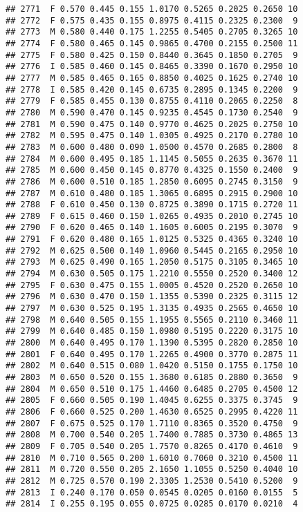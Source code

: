 \documentclass[
]{article}
\begin{document}
\begin{verbatim}
## 2771  F 0.570 0.445 0.155 1.0170 0.5265 0.2025 0.2650 10
## 2772  F 0.575 0.435 0.155 0.8975 0.4115 0.2325 0.2300  9
## 2773  M 0.580 0.440 0.175 1.2255 0.5405 0.2705 0.3265 10
## 2774  F 0.580 0.465 0.145 0.9865 0.4700 0.2155 0.2500 11
## 2775  F 0.580 0.425 0.150 0.8440 0.3645 0.1850 0.2705  9
## 2776  I 0.585 0.460 0.145 0.8465 0.3390 0.1670 0.2950 10
## 2777  M 0.585 0.465 0.165 0.8850 0.4025 0.1625 0.2740 10
## 2778  I 0.585 0.420 0.145 0.6735 0.2895 0.1345 0.2200  9
## 2779  F 0.585 0.455 0.130 0.8755 0.4110 0.2065 0.2250  8
## 2780  M 0.590 0.470 0.145 0.9235 0.4545 0.1730 0.2540  9
## 2781  M 0.590 0.475 0.140 0.9770 0.4625 0.2025 0.2750 10
## 2782  M 0.595 0.475 0.140 1.0305 0.4925 0.2170 0.2780 10
## 2783  M 0.600 0.480 0.090 1.0500 0.4570 0.2685 0.2800  8
## 2784  M 0.600 0.495 0.185 1.1145 0.5055 0.2635 0.3670 11
## 2785  M 0.600 0.450 0.145 0.8770 0.4325 0.1550 0.2400  9
## 2786  M 0.600 0.510 0.185 1.2850 0.6095 0.2745 0.3150  9
## 2787  M 0.610 0.480 0.185 1.3065 0.6895 0.2915 0.2900 10
## 2788  F 0.610 0.450 0.130 0.8725 0.3890 0.1715 0.2720 11
## 2789  F 0.615 0.460 0.150 1.0265 0.4935 0.2010 0.2745 10
## 2790  F 0.620 0.465 0.140 1.1605 0.6005 0.2195 0.3070  9
## 2791  F 0.620 0.480 0.165 1.0125 0.5325 0.4365 0.3240 10
## 2792  M 0.625 0.500 0.140 1.0960 0.5445 0.2165 0.2950 10
## 2793  M 0.625 0.490 0.165 1.2050 0.5175 0.3105 0.3465 10
## 2794  M 0.630 0.505 0.175 1.2210 0.5550 0.2520 0.3400 12
## 2795  F 0.630 0.475 0.155 1.0005 0.4520 0.2520 0.2650 10
## 2796  M 0.630 0.470 0.150 1.1355 0.5390 0.2325 0.3115 12
## 2797  M 0.630 0.525 0.195 1.3135 0.4935 0.2565 0.4650 10
## 2798  M 0.640 0.505 0.155 1.1955 0.5565 0.2110 0.3460 11
## 2799  M 0.640 0.485 0.150 1.0980 0.5195 0.2220 0.3175 10
## 2800  M 0.640 0.495 0.170 1.1390 0.5395 0.2820 0.2850 10
## 2801  F 0.640 0.495 0.170 1.2265 0.4900 0.3770 0.2875 11
## 2802  M 0.640 0.515 0.080 1.0420 0.5150 0.1755 0.1750 10
## 2803  M 0.650 0.520 0.155 1.3680 0.6185 0.2880 0.3650  9
## 2804  M 0.650 0.510 0.175 1.4460 0.6485 0.2705 0.4500 12
## 2805  F 0.660 0.505 0.190 1.4045 0.6255 0.3375 0.3745  9
## 2806  F 0.660 0.525 0.200 1.4630 0.6525 0.2995 0.4220 11
## 2807  F 0.675 0.525 0.170 1.7110 0.8365 0.3520 0.4750  9
## 2808  M 0.700 0.540 0.205 1.7400 0.7885 0.3730 0.4865 13
## 2809  F 0.705 0.540 0.205 1.7570 0.8265 0.4170 0.4610  9
## 2810  M 0.710 0.565 0.200 1.6010 0.7060 0.3210 0.4500 11
## 2811  M 0.720 0.550 0.205 2.1650 1.1055 0.5250 0.4040 10
## 2812  M 0.725 0.570 0.190 2.3305 1.2530 0.5410 0.5200  9
## 2813  I 0.240 0.170 0.050 0.0545 0.0205 0.0160 0.0155  5
## 2814  I 0.255 0.195 0.055 0.0725 0.0285 0.0170 0.0210  4

\end{verbatim}
\end{document}
